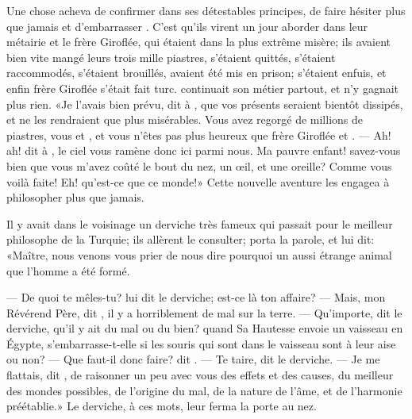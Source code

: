 Une chose acheva de confirmer  dans ses détestables principes, de
faire hésiter plus que jamais  et d’embarrasser . C’est
qu’ils virent un jour aborder dans leur métairie  et le frère
Giroflée, qui étaient dans la plus extrême misère; ils avaient bien
vite mangé leurs trois mille piastres, s’étaient quittés, s’étaient
raccommodés, s’étaient brouillés, avaient été mis en 
prison; s’étaient
enfuis, et enfin frère Giroflée s’était fait turc.  continuait
son métier partout, et n’y gagnait plus rien. «Je l’avais bien prévu,
dit  à , que vos présents seraient bientôt dissipés, et ne
les rendraient que plus misérables. Vous avez regorgé de millions de
piastres, vous et , et vous n’êtes pas plus heureux que frère
Giroflée et . — Ah! ah! dit  à , le ciel vous
ramène donc ici parmi nous. Ma pauvre enfant! savez-vous bien que vous
m’avez coûté le bout du nez, un œil, et une oreille? Comme vous voilà
faite! Eh! qu’est-ce que ce monde!» Cette nouvelle aventure les engagea
à philosopher plus que jamais.

Il y avait dans le voisinage un derviche très fameux qui passait pour
le meilleur philosophe de la Turquie; ils allèrent le consulter;
 porta la parole, et lui dit: «Maître, nous venons vous prier de
nous dire pourquoi un aussi étrange animal que l’homme a été formé.






— De quoi te mêles-tu? lui dit le derviche; est-ce là ton affaire? — Mais,
mon Révérend Père, dit , il y a horriblement de mal sur la
terre. — Qu’importe, dit le derviche, qu’il y ait du mal ou du bien?
quand Sa Hautesse envoie un vaisseau en Égypte, s’embarrasse-t-elle si
les souris qui sont dans le vaisseau sont à leur aise ou non? — Que
faut-il donc faire? dit . — Te taire, dit le derviche. — Je me
flattais, dit , de raisonner un peu avec vous des effets et des
causes, du meilleur des mondes possibles, de l’origine du mal, de la
nature de l’âme, et de l’harmonie préétablie.» Le derviche, à ces mots,
leur ferma la porte au nez.



